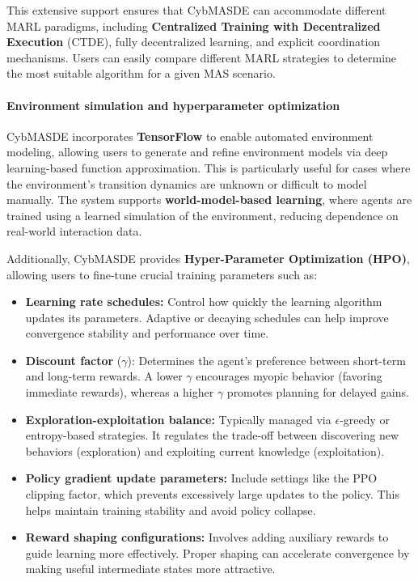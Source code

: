\documentclass[pdflatex,sn-mathphys-num]{sn-jnl}%
\theoremstyle{thmstyleone}%
\theoremstyle{thmstyletwo}%
\theoremstyle{thmstylethree}%
\begin{document}
This extensive support ensures that CybMASDE can accommodate different MARL paradigms, including \textbf{Centralized Training with Decentralized Execution} (CTDE), fully decentralized learning, and explicit coordination mechanisms. Users can easily compare different MARL strategies to determine the most suitable algorithm for a given MAS scenario.

\paragraph{Environment simulation and hyperparameter optimization}
CybMASDE incorporates \textbf{TensorFlow} to enable automated environment modeling, allowing users to generate and refine environment models via deep learning-based function approximation. This is particularly useful for cases where the environment's transition dynamics are unknown or difficult to model manually. The system supports \textbf{world-model-based learning}, where agents are trained using a learned simulation of the environment, reducing dependence on real-world interaction data.

Additionally, CybMASDE provides \textbf{Hyper-Parameter Optimization (HPO)}, allowing users to fine-tune crucial training parameters such as:
\begin{itemize}
    \item \textbf{Learning rate schedules:} Control how quickly the learning algorithm updates its parameters. Adaptive or decaying schedules can help improve convergence stability and performance over time.
    \item \textbf{Discount factor} ($\gamma$): Determines the agent's preference between short-term and long-term rewards. A lower $\gamma$ encourages myopic behavior (favoring immediate rewards), whereas a higher $\gamma$ promotes planning for delayed gains.
    \item \textbf{Exploration-exploitation balance:} Typically managed via $\epsilon$-greedy or entropy-based strategies. It regulates the trade-off between discovering new behaviors (exploration) and exploiting current knowledge (exploitation).
    \item \textbf{Policy gradient update parameters:} Include settings like the PPO clipping factor, which prevents excessively large updates to the policy. This helps maintain training stability and avoid policy collapse.
    \item \textbf{Reward shaping configurations:} Involves adding auxiliary rewards to guide learning more effectively. Proper shaping can accelerate convergence by making useful intermediate states more attractive.
\end{itemize}
\end{document}
